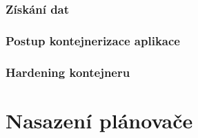 \documentclass[thesis=M,czech]{FITthesis}[2019/12/23]
\theoremstyle{plain}
\theoremstyle{definition}
\begin{document}

\subsubsection{Získání dat}



\subsubsection{Postup kontejnerizace aplikace}


\subsubsection{Hardening kontejneru}


\section{Nasazení plánovače}
\end{document}
